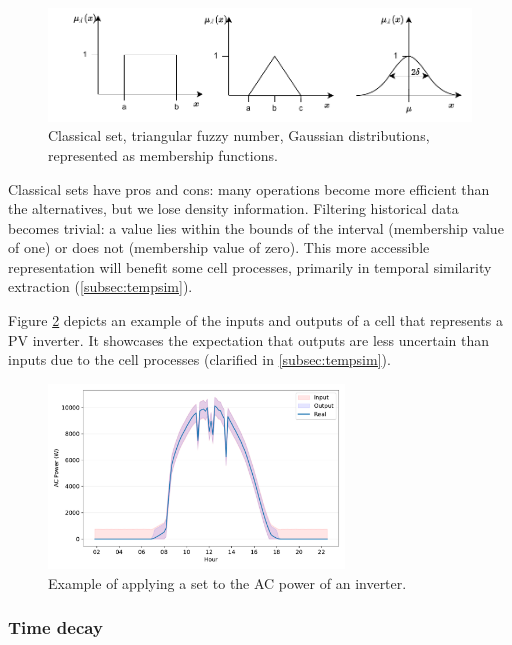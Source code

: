 \begin{figure}[h!]
    \centering
    \includegraphics[width=15cm]{figures/chapter4/cell/classic_fuzzy_gaussian.pdf}
    \caption{Classical set, triangular fuzzy number, Gaussian distributions, represented as membership functions.}
    \label{fig:classicfuzzygaussian}
\end{figure}

Classical sets have pros and cons: many operations become more efficient than the alternatives, but we lose density information. Filtering historical data becomes trivial: a value lies within the bounds of the interval (membership value of one) or does not (membership value of zero). This more accessible representation will benefit some cell processes, primarily in temporal similarity extraction (\ref{subsec:tempsim}).

Figure \ref{fig:exampleset} depicts an example of the inputs and outputs of a cell that represents a PV inverter. It showcases the expectation that outputs are less uncertain than inputs due to the cell processes (clarified in \ref{subsec:tempsim}).

\begin{figure}[h!]
    \centering
    \includegraphics[width=0.7\textwidth]{figures/chapter4/cell/example_fuzzy.pdf}
    \caption{Example of applying a set to the AC power of an inverter.}
    \label{fig:exampleset}
\end{figure}


\subsubsection{Time decay} \label{subsec:timedecay}

